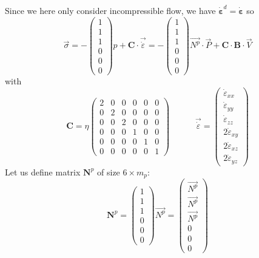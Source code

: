 Since we here only consider incompressible flow, we have $\dot{\bm \varepsilon}^d=\dot{\bm \varepsilon}$
so
\begin{equation}
\vec{\sigma} 
=-\left( 
\begin{array}{c}
1 \\ 1 \\ 1 \\ 0 \\ 0 \\ 0
\end{array}
\right) p+ {\bm C} \cdot \vec{\dot\varepsilon}
=
- \left(
\begin{array}{c}
1 \\ 1 \\ 1 \\ 0 \\ 0 \\ 0
\end{array}
\right)
\vec{N^p} \cdot {\vec P}  + 
{\bm C} \cdot  {\bm B}\cdot {\vec V}
\end{equation}
with
\begin{equation}
{\bm C}=
\eta
\left(
\begin{array}{cccccc}
2 & 0 & 0 & 0 & 0 & 0\\
0 & 2 & 0 & 0 & 0 & 0\\
0 & 0 & 2 & 0 & 0 & 0\\ 
0 & 0 & 0 & 1 & 0 & 0\\ 
0 & 0 & 0 & 0 & 1 & 0\\ 
0 & 0 & 0 & 0 & 0 & 1
\end{array}
\right)
\quad\quad\quad
\vec{\dot \varepsilon} = 
\left(
\begin{array}{c}
\dot \varepsilon_{xx} \\
\dot \varepsilon_{yy} \\
\dot \varepsilon_{zz} \\
2\dot \varepsilon_{xy}\\ 
2\dot \varepsilon_{xz} \\
2\dot \varepsilon_{yz} 
\end{array}
\right)  \label{eq:mixedC}
\end{equation}
Let us define matrix ${\bm N}^p$ of size $6\times m_p$:
\begin{equation}
{\bm N}^p=
\left(
\begin{array}{c}
1 \\ 1 \\ 1 \\ 0 \\ 0 \\ 0
\end{array}
\right)
\vec{N^p} 
=
\left(
\begin{array}{c}
\vec{N^p} \\
\vec{N^p} \\
\vec{N^p} \\
0 \\
0 \\
0
\end{array}
\right)
\end{equation}
